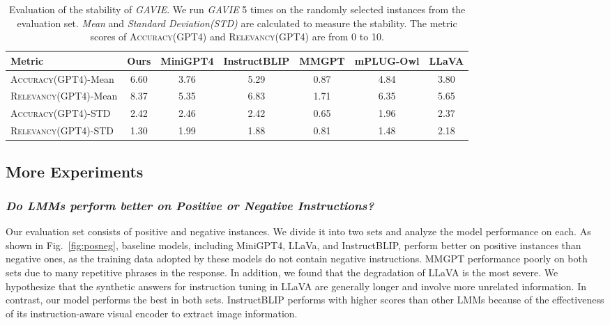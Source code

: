 \begin{table}[h]
\setlength\tabcolsep{3pt}
\centering
\small
\begin{tabular}{lcccccc}
\toprule[1.5pt]
Metric& Ours & MiniGPT4 & InstructBLIP & MMGPT& mPLUG-Owl & LLaVA\\
\midrule
\textsc{Accuracy(GPT4)}-Mean&6.60&3.76&5.29&0.87&4.84&3.80\\
\textsc{Relevancy(GPT4)}-Mean&8.37&5.35&6.83&1.71&6.35&5.65\\
\midrule
\textsc{Accuracy(GPT4)}-STD&2.42&2.46&2.42&0.65&1.96&2.37\\
\textsc{Relevancy(GPT4)}-STD&1.30&1.99&1.88&0.81&1.48&2.18\\
\bottomrule
\end{tabular}
\vspace{0.06in}
\caption{Evaluation of the stability of \textit{GAVIE}. We run \textit{GAVIE} 5 times on the randomly selected instances from the evaluation set. \textit{Mean} and \textit{Standard Deviation(STD)} are calculated to measure the stability. The metric scores of \textsc{Accuracy(GPT4)} and \textsc{Relevancy(GPT4)} are from 0 to 10.
}
\label{tab:stability1}
\end{table}

\subsection{More Experiments}
\subsubsection{\textit{Do LMMs perform better on Positive or Negative Instructions? }}
Our evaluation set consists of positive and negative instances. We divide it into two sets and analyze the model performance on each. As shown in Fig.~\ref{fig:posneg}, baseline models, including MiniGPT4, LLaVa, and InstructBLIP,  perform better on positive instances than negative ones, as the training data adopted by these models do not contain negative instructions. MMGPT performance poorly on both sets due to many repetitive phrases in the response. In addition, we found that the degradation of LLaVA is the most severe. We hypothesize that the synthetic answers for instruction tuning in LLaVA are generally longer and involve more unrelated information. In contrast, our model performs the best in both sets. InstructBLIP performs with higher scores than other LMMs because of the effectiveness of its instruction-aware visual encoder to extract image information.





